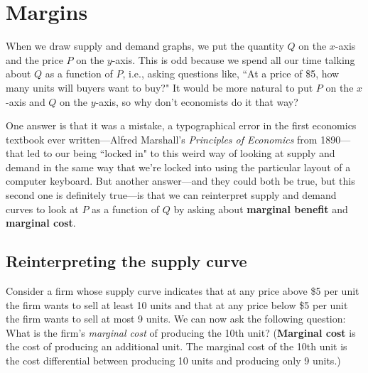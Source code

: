 \chapter{Margins}
\label{3margins}

When we draw supply and demand graphs, we put the quantity $Q$ on the $x$-axis and the price $P$ on the $y$-axis. This is odd because we spend all our time talking about $Q$ as a function of $P$, i.e., asking questions like, ``At a price of \$5, how many units will buyers want to buy?" It would be more natural to put $P$ on the $x$-axis and $Q$ on the $y$-axis, so why don't economists do it that way?

One answer is that it was a mistake, a typographical error in the first economics textbook ever written---Alfred Marshall's \emph{Principles of Economics} from 1890---that led to our being ``locked in" to this weird way of looking at supply and demand in the same way that we're locked into using the particular layout of a computer keyboard. But another answer---and they could both be true, but this second one is definitely true---is that we can reinterpret supply and demand curves to look at $P$ as a function of $Q$ by asking about \textbf{marginal benefit} and \textbf{marginal cost}.


\section{Reinterpreting the supply curve}

Consider a firm whose supply curve indicates that at any price above \$5 per unit the firm wants to sell at least 10 units and that at any price below \$5 per unit the firm wants to sell at most 9 units. We can now ask the following question: What is the firm's \emph{marginal cost} of producing the 10th unit? (\textbf{Marginal cost} is the cost of producing an additional unit. The marginal cost of the 10th unit is the cost differential between producing 10 units and producing only 9 units.)

